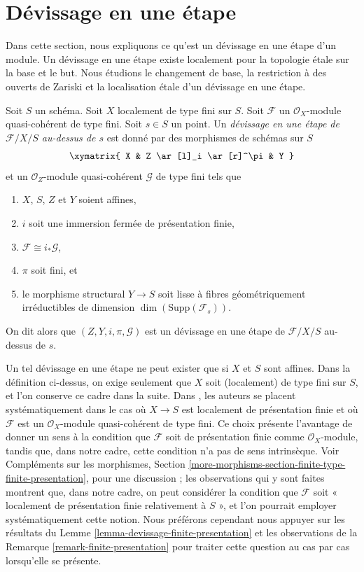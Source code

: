 \section{D\'evissage en une étape}
\label{section-one-step-devissage}

\noindent
Dans cette section, nous expliquons ce qu'est un d\'evissage en une étape d'un
module. Un d\'evissage en une étape existe localement pour la topologie \'etale sur la base et le but.
Nous étudions le changement de base, la restriction à des ouverts de Zariski et la localisation \'etale
d'un d\'evissage en une étape.

\begin{definition}
\label{definition-one-step-devissage}
Soit $S$ un schéma.
Soit $X$ localement de type fini sur $S$.
Soit $\mathcal{F}$ un $\mathcal{O}_X$-module quasi-cohérent de type fini.
Soit $s \in S$ un point.
Un {\it d\'evissage en une étape de $\mathcal{F}/X/S$ au-dessus de $s$}
est donné par des morphismes de schémas sur $S$
$$
\xymatrix{
X & Z \ar[l]_i \ar[r]^\pi & Y
}
$$
et un $\mathcal{O}_Z$-module quasi-cohérent $\mathcal{G}$ de type fini
tels que
\begin{enumerate}
\item $X$, $S$, $Z$ et $Y$ soient affines,
\item $i$ soit une immersion fermée de présentation finie,
\item $\mathcal{F} \cong i_*\mathcal{G}$,
\item $\pi$ soit fini, et
\item le morphisme structural $Y \to S$ soit lisse à
fibres géométriquement irréductibles de
dimension $\dim(\text{Supp}(\mathcal{F}_s))$.
\end{enumerate}
On dit alors que $(Z, Y, i, \pi, \mathcal{G})$ est un
d\'evissage en une étape de $\mathcal{F}/X/S$ au-dessus de $s$.
\end{definition}

\noindent
Un tel d\'evissage en une étape ne peut exister que si $X$ et $S$
sont affines. Dans la définition ci-dessus, on exige seulement que $X$ soit
(localement) de type fini sur $S$, et l'on conserve ce cadre
dans la suite. Dans \cite{GruRay}, les auteurs se placent systématiquement dans le cas
où $X \to S$ est localement de présentation finie et où $\mathcal{F}$
est un $\mathcal{O}_X$-module quasi-cohérent de type fini. Ce choix présente
l'avantage de donner un sens à la condition que $\mathcal{F}$ soit
de présentation finie comme $\mathcal{O}_X$-module, tandis que, dans notre
cadre, cette condition n'a pas de sens intrinsèque. Voir
Compléments sur les morphismes, Section
\ref{more-morphisms-section-finite-type-finite-presentation},
pour une discussion ; les observations qui y sont faites montrent que, dans notre cadre,
on peut considérer la condition que $\mathcal{F}$ soit « localement de présentation
finie relativement à $S$ », et l'on pourrait employer systématiquement cette
notion. Nous préférons cependant nous appuyer sur les résultats du
Lemme \ref{lemma-devissage-finite-presentation}
et les observations de la
Remarque \ref{remark-finite-presentation}
pour traiter cette question au cas par cas lorsqu'elle se présente.

